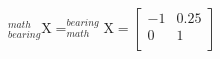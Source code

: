 \documentclass[12pt,fleqn]{standalone}
\begin{document}
\begin{preview}
\Large
${\displaystyle _{bearing}^{math}\textrm{X}=_{math}^{bearing}\textrm{X}=
\begin{bmatrix}
-1 & 0.25 \\
0 & 1 \\
\end{bmatrix}}
$
\end{preview}
\end{document}
